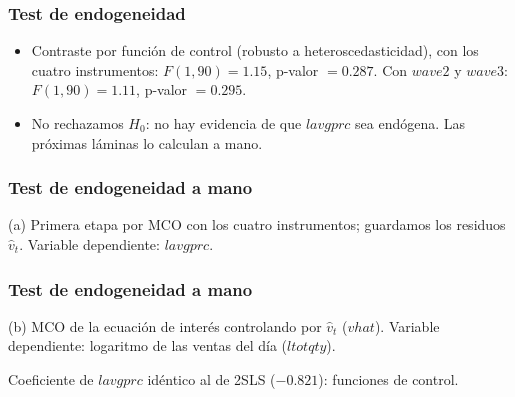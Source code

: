 \documentclass[t, compress, spanish, aspectratio=169]{beamer}
\begin{document}
\begin{frame}
	\frametitle{Test de endogeneidad}
	\begin{itemize}
		\item Contraste por funci\'on de control (robusto a heteroscedasticidad), con los cuatro instrumentos: $F(1,90)=1.15$, p-valor $=0.287$. Con $wave2$ y $wave3$: $F(1,90)=1.11$, p-valor $=0.295$.
		\item No rechazamos $H_0$: no hay evidencia de que $lavgprc$ sea end\'ogena. Las pr\'oximas l\'aminas lo calculan a mano.
	\end{itemize}
\end{frame}
\begin{frame}
	\frametitle{Test de endogeneidad a mano}
	\vspace*{-0.6em}
	(a) Primera etapa por MCO con los cuatro instrumentos; guardamos los residuos $\hat v_t$. Variable dependiente: $lavgprc$.
	\begin{center}
	\footnotesize\renewcommand{\arraystretch}{0.9}
	
	\end{center}
\end{frame}

\begin{frame}
	\frametitle{Test de endogeneidad a mano}
	(b) MCO de la ecuaci\'on de inter\'es controlando por $\hat v_t$ ($vhat$). Variable dependiente: logaritmo de las ventas del d\'ia ($ltotqty$).
	\begin{center}
	\footnotesize\renewcommand{\arraystretch}{0.9}
	
	\end{center}
	\small
	Coeficiente de $lavgprc$ id\'entico al de 2SLS ($-0.821$): funciones de control.
\end{frame}
\end{document}

